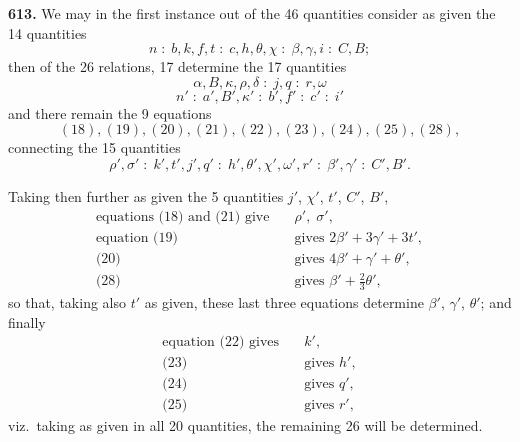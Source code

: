 \documentclass[11pt,a4paper]{article}
\newcommand{\artno}[1]{\textbf{#1.}\quad}
\begin{document}
\medskip

\artno{613} We may in the first instance out of the 46 quantities consider
as given the 14 quantities
\[
  n \;:\; b, k, f, t \;:\; c, h, \theta, \chi \;:\; \beta, \gamma, i \;:\; C, B;
\]
then of the 26 relations, 17 determine the 17 quantities
\[
  \alpha, B, \kappa, \rho, \delta \;:\; j, q \;:\; r, \omega
\]
\[
  n' \;:\; a', B', \kappa' \;:\; b', f' \;:\; c' \;:\; i'
\]
and there remain the 9 equations
\[
  (18), (19), (20), (21), (22), (23), (24), (25), (28),
\]
connecting the 15 quantities
\[
  \rho', \sigma' \;:\; k', t', j', q' \;:\; h', \theta', \chi', \omega', r' \;:\;
  \beta', \gamma' \;:\; C', B'.
\]

Taking then further as given the 5 quantities $j'$, $\chi'$, $t'$, $C'$, $B'$,
\begin{align*}
  \text{equations (18) and (21) give} \quad & \rho',\;\sigma', \\
  \text{equation (19)} \quad & \text{gives } 2\beta' + 3\gamma' + 3t', \\
  \text{(20)} \quad & \text{gives } 4\beta' + \gamma' + \theta', \\
  \text{(28)} \quad & \text{gives } \beta' + \tfrac{2}{3}\theta',
\end{align*}
so that, taking also $t'$ as given, these last three equations determine
$\beta'$, $\gamma'$, $\theta'$; and finally
\begin{align*}
  \text{equation (22) gives} \quad & k', \\
  \text{(23)} \quad & \text{gives } h', \\
  \text{(24)} \quad & \text{gives } q', \\
  \text{(25)} \quad & \text{gives } r',
\end{align*}
viz.\ taking as given in all 20 quantities, the remaining 26 will be
determined.

\medskip
\end{document}
